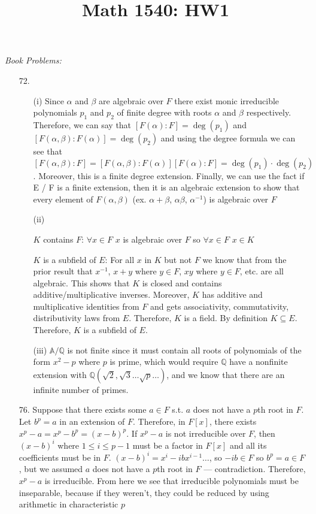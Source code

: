 \documentclass{article}
\title{Math 1540: HW1}
\begin{document}
\maketitle

\emph{Book Problems:}
\begin{enumerate}
    \item[72.] 
    \begin{enumerate}
        \item[(i)] Since \(\alpha\) and \(\beta\) are algebraic over \(F\) there exist monic irreducible polynomials \(p_1\) and \(p_2\) of finite degree with roots \(\alpha\) and \(\beta\) respectively. Therefore, we can say that \([F(\alpha) : F] = \deg(p_1)\) and \([F(\alpha, \beta) : F(\alpha)] = \deg(p_2)\) and using the degree formula we can see that \([F(\alpha, \beta) : F] = [F(\alpha, \beta) : F(\alpha)][F(\alpha) : F] = \deg(p_1) \cdot \deg(p_2)\). Moreover, this is a finite degree extension. Finally, we can use the fact if E / F is a finite extension, then it is an algebraic extension to show that every element of \(F(\alpha, \beta)\) (ex. \(\alpha + \beta\), \(\alpha \beta \), \(\alpha^{-1}\)) is algebraic over \(F\)
        \item[(ii)] 
        
        \(K\) contains \(F\): \(\forall x \in F\) \(x\) is algebraic over \(F\) so \(\forall x \in F\) \(x \in K\) 
        
        \(K\) is a subfield of \(E\): For all \(x\) in \(K\) but not \(F\) we know that from the prior result that \(x^{-1}\), \(x + y\) where \(y \in F\), \(xy\) where \(y \in F\), etc. are all algebraic. This shows that \(K\) is closed and contains additive/multiplicative inverses. Moreover, \(K\) has additive and multiplicative identities from \(F\) and gets associativity, commutativity, distributivity laws from \(E\). Therefore, \(K\) is a field. By definition \(K \subseteq E\). Therefore, \(K\) is a subfield of \(E\).

        \item[(iii)] \(\mathbb{A}/\mathbb{Q}\) is not finite since it must contain all roots of polynomials of the form \(x^2 - p\) where \(p\) is prime, which would require \(\mathbb{Q}\) have a nonfinite extension with \(\mathbb{Q} (\sqrt{2}, \sqrt{3} \ldots \sqrt{p} \ldots)\), and we know that there are an infinite number of primes.

    \end{enumerate} 
    \item[76.] Suppose that there exists some \(a \in F\) s.t. \(a\) does not have a \(p\)th root in \(F\). Let \(b^p = a\) in an extension of \(F\). Therefore, in \(F[x]\), there exists \(x^p - a = x^p - b^p = (x - b)^p\). If \(x^p - a\) is not irreducible over \(F\), then \((x - b)^i\) where \(1 \leq i \leq p - 1\) must be a factor in \(F[x]\) and all its coefficients must be in \(F\). \((x - b)^i = x^i - i b x^{i -1} \ldots \), so \(- i b \in F\) so \(b^p = a \in F\), but we assumed \(a\) does not have a \(p\)th root in \(F\) — contradiction. Therefore, \(x^p -a\) is irreducible. From here we see that irreducible polynomials must be inseparable, because if they weren't, they could be reduced by using arithmetic in characteristic \(p\) 


\end{enumerate}
\end{document}
